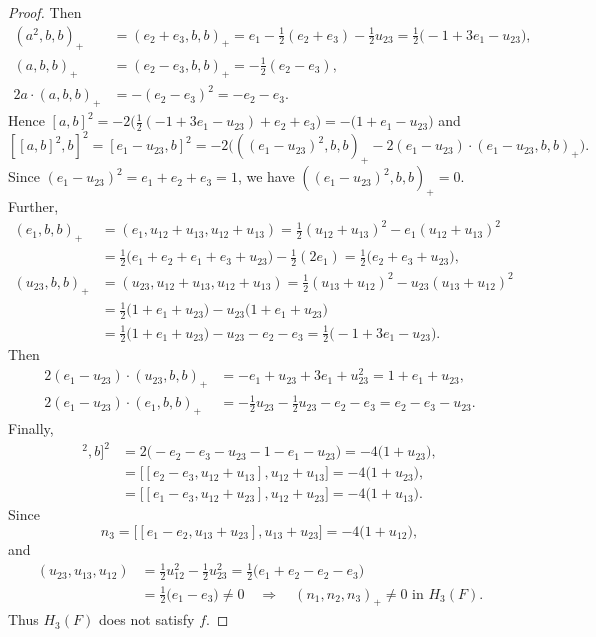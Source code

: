 \documentclass{article}
\begin{document}
\begin{proof}
Then
\begin{align*}
(a^2,b,b)_+ &= (e_2+e_3,b,b)_+ = e_1-\frac{1}{2}(e_2+e_3)-\frac{1}{2}u_{23} = \frac{1}{2}\bigl(-1+3e_1-u_{23}\bigr), \\
(a,b,b)_+ &= (e_2-e_3,b,b)_+ = -\frac{1}{2}(e_2-e_3), \\
2a\cdot(a,b,b)_+ &= -(e_2-e_3)^2 = -e_2-e_3.
\end{align*}
Hence $[a,b]^2 = -2\bigl(\frac{1}{2}(-1+3e_1-u_{23})+e_2+e_3\bigr) = -\bigl(1+e_1-u_{23}\bigr)$ and
\[
[[a,b]^2,b]^2 = [e_1-u_{23},b]^2 = -2\bigl(((e_1-u_{23})^2,b,b)_+ - 2(e_1-u_{23})\cdot(e_1-u_{23},b,b)_+\bigr).
\]
Since $(e_1-u_{23})^2 = e_1+e_2+e_3 = 1$, we have $((e_1-u_{23})^2,b,b)_+ = 0$. Further,
\begin{align*}
(e_1,b,b)_+ &= (e_1,u_{12}+u_{13},u_{12}+u_{13}) = \frac{1}{2}(u_{12}+u_{13})^2 - e_1(u_{12}+u_{13})^2 \\
&= \frac{1}{2}\bigl(e_1+e_2+e_1+e_3+u_{23}\bigr) - \frac{1}{2}(2e_1) = \frac{1}{2}\bigl(e_2+e_3+u_{23}\bigr), \\
(u_{23},b,b)_+ &= (u_{23},u_{12}+u_{13},u_{12}+u_{13}) = \frac{1}{2}(u_{13}+u_{12})^2 - u_{23}(u_{13}+u_{12})^2 \\
&= \frac{1}{2}\bigl(1+e_1+u_{23}\bigr) - u_{23}\bigl(1+e_1+u_{23}\bigr) \\
&= \frac{1}{2}\bigl(1+e_1+u_{23}\bigr) - u_{23} - e_2 - e_3 = \frac{1}{2}\bigl(-1+3e_1-u_{23}\bigr).
\end{align*}
Then
\begin{align*}
2(e_1-u_{23})\cdot(u_{23},b,b)_+ &= -e_1+u_{23}+3e_1+u_{23}^2 = 1+e_1+u_{23}, \\
2(e_1-u_{23})\cdot(e_1,b,b)_+ &= -\frac{1}{2}u_{23} - \frac{1}{2}u_{23} - e_2 - e_3 = e_2 - e_3 - u_{23}.
\end{align*}
Finally,
\begin{align*}
[[a,b]^2,b]^2 &= 2\bigl(-e_2-e_3-u_{23} - 1 - e_1 - u_{23}\bigr) = -4\bigl(1+u_{23}\bigr), \\
&= \bigl[[e_2-e_3, u_{12}+u_{13}], u_{12}+u_{13}\bigr] = -4\bigl(1+u_{23}\bigr), \\
&= \bigl[[e_1-e_3, u_{12}+u_{23}], u_{12}+u_{23}\bigr] = -4\bigl(1+u_{13}\bigr).
\end{align*}
Since
\[
n_3 = \bigl[[e_1-e_2, u_{13}+u_{23}], u_{13}+u_{23}\bigr] = -4\bigl(1+u_{12}\bigr),
\]
and
\begin{align*}
(u_{23},u_{13},u_{12}) &= \frac{1}{2}u_{12}^2 - \frac{1}{2}u_{23}^2 = \frac{1}{2}\bigl(e_1+e_2 - e_2 - e_3\bigr) \\
&= \frac{1}{2}\bigl(e_1-e_3\bigr) \neq 0 \quad \Rightarrow \quad (n_1,n_2,n_3)_+ \neq 0 \text{ in } H_3(F).
\end{align*}
Thus $H_3(F)$ does not satisfy $f$.


\end{proof}
\end{document}
